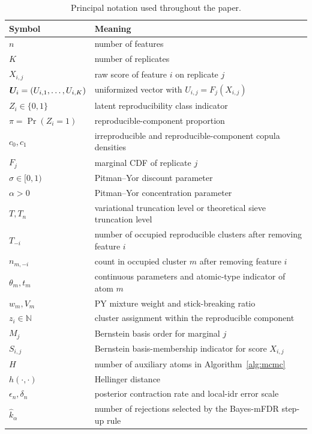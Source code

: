 \begin{table}[H]
\centering
\caption{Principal notation used throughout the paper.}
\label{tab:notation}
\small
\setlength{\tabcolsep}{4pt}
\begin{tabularx}{\textwidth}{lY}
\toprule
Symbol & Meaning \\
\midrule
$n$ & number of features \\
$K$ & number of replicates \\
$X_{i,j}$ & raw score of feature $i$ on replicate $j$ \\
$\bm{U}_i=(U_{i,1},\ldots,U_{i,K})$ & uniformized vector with $U_{i,j}=F_j(X_{i,j})$ \\
$Z_i\in\{0,1\}$ & latent reproducibility class indicator \\
$\pi=\Pr(Z_i=1)$ & reproducible-component proportion \\
$c_0,c_1$ & irreproducible and reproducible-component copula densities \\
$F_j$ & marginal CDF of replicate $j$ \\
$\sigma\in[0,1)$ & Pitman--Yor discount parameter \\
$\alpha>0$ & Pitman--Yor concentration parameter \\
$T,T_n$ & variational truncation level or theoretical sieve truncation level \\
$T_{-i}$ & number of occupied reproducible clusters after removing feature $i$ \\
$n_{m,-i}$ & count in occupied cluster $m$ after removing feature $i$ \\
$\theta_m,t_m$ & continuous parameters and atomic-type indicator of atom $m$ \\
$w_m,V_m$ & PY mixture weight and stick-breaking ratio \\
$z_i\in\mathbb N$ & cluster assignment within the reproducible component \\
$M_j$ & Bernstein basis order for marginal $j$ \\
$S_{i,j}$ & Bernstein basis-membership indicator for score $X_{i,j}$ \\
$H$ & number of auxiliary atoms in Algorithm~\ref{alg:mcmc} \\
$h(\cdot,\cdot)$ & Hellinger distance \\
$\epsilon_n,\delta_n$ & posterior contraction rate and local-idr error scale \\
$\widehat k_\alpha$ & number of rejections selected by the Bayes-mFDR step-up rule \\
\bottomrule
\end{tabularx}
\end{table}
